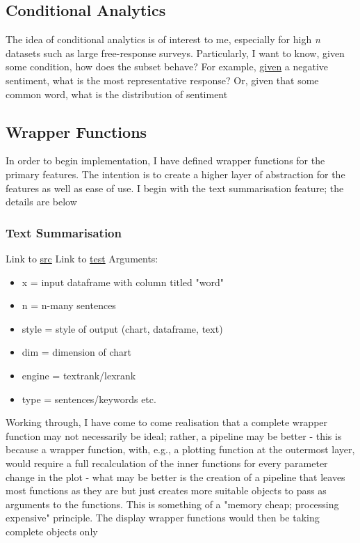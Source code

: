 \documentclass[11pt]{article}
\begin{document}
\subsection{Conditional Analytics}
\label{sec:org052e200}
The idea of conditional analytics is of interest to me, especially for
high \emph{n} datasets such as large free-response surveys. Particularly, I
want to know, given some condition, how does the subset behave? For
example, \href{sent-dist.org}{given} a negative sentiment, what is the most representative
response? Or, given that some common word, what is the distribution of
sentiment
\subsection{Wrapper Functions}
\label{sec:orgeb814cd}
In order to begin implementation, I have defined wrapper functions for
the primary features. The intention is to create a higher layer of
abstraction for the features as well as ease of use. I begin with the
text summarisation feature; the details are below
\subsubsection{Text Summarisation}
\label{sec:orgddd9ee7}
Link to \href{file:///home/user/curr/stats-781/src/summ-wrapper.R}{src}
Link to \href{file:///home/user/curr/stats-781/test/summ-wrapper-test.R}{test}
Arguments:
\begin{itemize}
\item x = input dataframe with column titled "word"
\item n = n-many sentences
\item style = style of output (chart, dataframe, text)
\item dim = dimension of chart
\item engine = textrank/lexrank
\item type = sentences/keywords etc.
\end{itemize}

Working through, I have come to come realisation that a complete
wrapper function may not necessarily be ideal; rather, a pipeline may
be better - this is because a wrapper function, with, e.g., a plotting
function at the outermost layer, would require a full recalculation of
the inner functions for every parameter change in the plot - what may
be better is the creation of a pipeline that leaves most functions as
they are but just creates more suitable objects to pass as arguments
to the functions. This is something of a "memory cheap; processing
expensive" principle. The display wrapper functions would then be
taking complete objects only 
\end{document}
